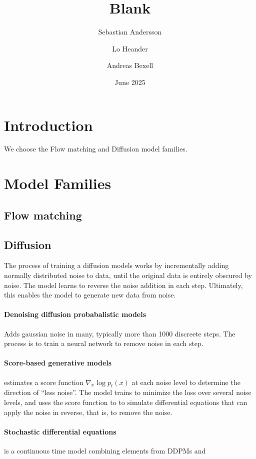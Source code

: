 \documentclass{article}
\title{Blank}
\author{Sebastian Andersson \and Lo Heander \and Andreas Bexell}
\date{June 2025}
\begin{document}
\maketitle

\section{Introduction}

We choose the Flow matching and Diffusion model families. 

\section{Model Families}

\subsection{Flow matching}

\subsection{Diffusion}

The process of training a diffusion models works by incrementally adding normally distributed noise to data, until the original data is entirely obscured by noise.
The model learns to reverse the noise addition in each step. Ultimately, this enables the model to generate new data from noise.



\paragraph{Denoising diffusion probabalistic models} Adds gaussian noise in many, typically more than 1000 discreete steps. The process is to train a neural network to remove noise in each step.

\paragraph{Score-based generative models} estimates a score function $\nabla_x \log p_t(x)$ at each noise level to determine the direction of ``less noise''. The model trains to minimize the loss over several noise levels, and uses the score function to to simulate differential equations that can apply the noise in reverse, that is, to remove the noise.

\paragraph{Stochastic differential equations} is a continuous time model combining elements from DDPMs and 
\end{document}
